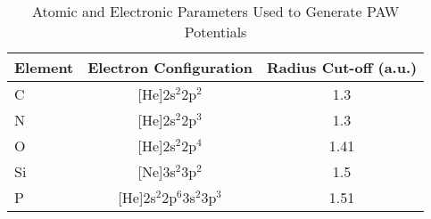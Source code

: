 \documentclass[letterpaper,amsmath,amssymb,prb,preprint,12pt]{revtex4-1}%
\begin{document}
\begin{table}[h]
\caption{Atomic and Electronic Parameters Used to Generate PAW Potentials}
\begin{tabular}{l@{\hskip 1cm}c@{\hskip 1cm}c}
\hline
Element&Electron Configuration&Radius Cut-off (a.u.)\\
\hline
\hline
C & [He]2s$^{2}$2p$^{2}$ & 1.3 \\
N & [He]2s$^{2}$2p$^{3}$ & 1.3 \\
O & [He]2s$^{2}$2p$^{4}$ & 1.41 \\
Si & [Ne]3s$^{2}$3p$^{2}$ & 1.5 \\
P & [He]2s$^{2}$2p$^{6}$3s$^{2}$3p$^{3}$ & 1.51 \\
\hline
\end{tabular}
\label{paw}
\end{table}




% 
% 
\end{document}
